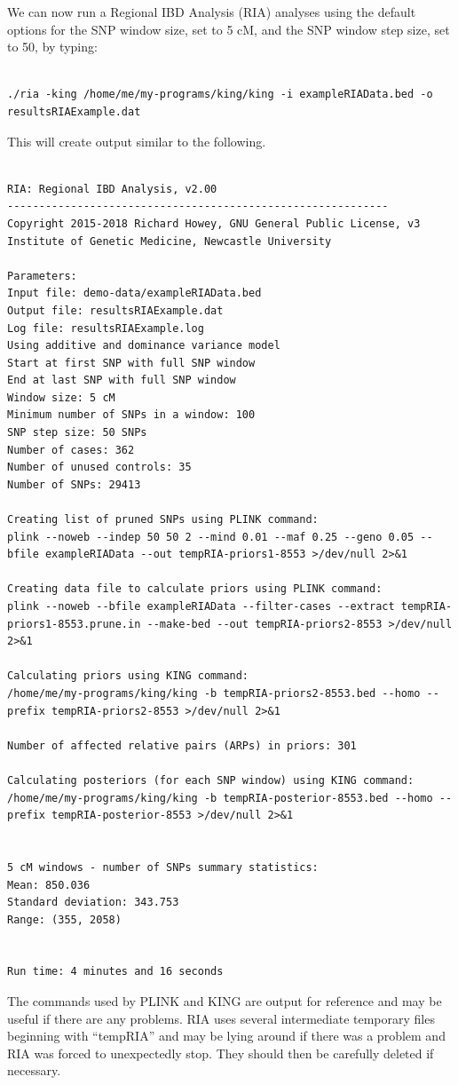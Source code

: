\documentclass[a4paper,12pt]{article}
\begin{document}
We can now run a Regional IBD Analysis (RIA) analyses using the default options for the SNP window size, set to 5 cM, and the SNP window step size, set to 50, by typing: 
\vspace{0.35cm} \begin{lstlisting}

./ria -king /home/me/my-programs/king/king -i exampleRIAData.bed -o resultsRIAExample.dat

\end{lstlisting} \vspace{0.35cm}
This will create output similar to the following. 
\vspace{0.35cm} \begin{lstlisting}

RIA: Regional IBD Analysis, v2.00
------------------------------------------------------------
Copyright 2015-2018 Richard Howey, GNU General Public License, v3
Institute of Genetic Medicine, Newcastle University

Parameters:
Input file: demo-data/exampleRIAData.bed
Output file: resultsRIAExample.dat
Log file: resultsRIAExample.log
Using additive and dominance variance model
Start at first SNP with full SNP window
End at last SNP with full SNP window
Window size: 5 cM
Minimum number of SNPs in a window: 100
SNP step size: 50 SNPs
Number of cases: 362
Number of unused controls: 35
Number of SNPs: 29413

Creating list of pruned SNPs using PLINK command:
plink --noweb --indep 50 50 2 --mind 0.01 --maf 0.25 --geno 0.05 --bfile exampleRIAData --out tempRIA-priors1-8553 >/dev/null 2>&1

Creating data file to calculate priors using PLINK command:
plink --noweb --bfile exampleRIAData --filter-cases --extract tempRIA-priors1-8553.prune.in --make-bed --out tempRIA-priors2-8553 >/dev/null 2>&1

Calculating priors using KING command:
/home/me/my-programs/king/king -b tempRIA-priors2-8553.bed --homo --prefix tempRIA-priors2-8553 >/dev/null 2>&1

Number of affected relative pairs (ARPs) in priors: 301

Calculating posteriors (for each SNP window) using KING command:
/home/me/my-programs/king/king -b tempRIA-posterior-8553.bed --homo --prefix tempRIA-posterior-8553 >/dev/null 2>&1


5 cM windows - number of SNPs summary statistics:
Mean: 850.036
Standard deviation: 343.753
Range: (355, 2058)


Run time: 4 minutes and 16 seconds

\end{lstlisting} \vspace{0.35cm}
The commands used by PLINK and KING are output for reference and may be useful if there are any problems. RIA uses several intermediate temporary files beginning with ``tempRIA'' and may be lying around if there was a problem and RIA was forced to unexpectedly stop. They should then be carefully deleted if necessary. 
\end{document}
